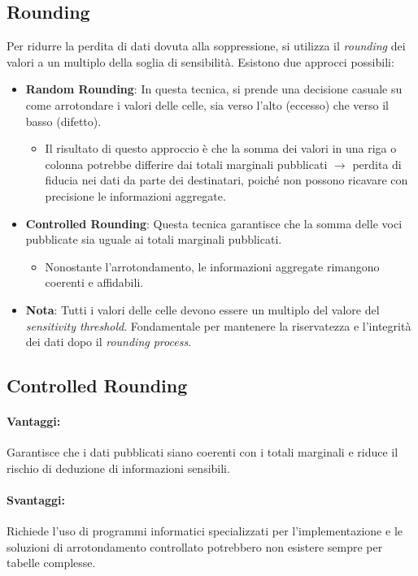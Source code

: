 \documentclass{report}
\begin{document}
\subsection{Rounding}
Per ridurre la perdita di dati dovuta alla soppressione, si utilizza il \textit{rounding} dei valori a un multiplo della soglia di sensibilità.
Esistono due approcci possibili:
\begin{itemize}
    \item \textbf{Random Rounding}: In questa tecnica, si prende una decisione casuale su come arrotondare i valori delle celle, sia verso l'alto (eccesso) che verso il basso (difetto). 
    \begin{itemize}
        \item Il risultato di questo approccio è che la somma dei valori in una riga o colonna potrebbe differire dai totali marginali pubblicati $\rightarrow$ perdita di fiducia nei dati da parte dei destinatari, poiché non possono ricavare con precisione le informazioni aggregate.
    \end{itemize}
    \item \textbf{Controlled Rounding}: Questa tecnica garantisce che la somma delle voci pubblicate sia uguale ai totali marginali pubblicati. 
    \begin{itemize}
        \item Nonostante l'arrotondamento, le informazioni aggregate rimangono coerenti e affidabili.
    \end{itemize}
    \item \textbf{Nota}: Tutti i valori delle celle devono essere un multiplo del valore del \textit{sensitivity threshold}. 
    Fondamentale per mantenere la riservatezza e l'integrità dei dati dopo il \textit{rounding process}.
\end{itemize}

\subsection{Controlled Rounding}
\paragraph{Vantaggi:}
Garantisce che i dati pubblicati siano coerenti con i totali marginali e riduce il rischio di deduzione di informazioni sensibili.

\paragraph{Svantaggi:}
Richiede l'uso di programmi informatici specializzati per l'implementazione e le soluzioni di arrotondamento controllato potrebbero non esistere sempre per tabelle complesse.
\end{document}
